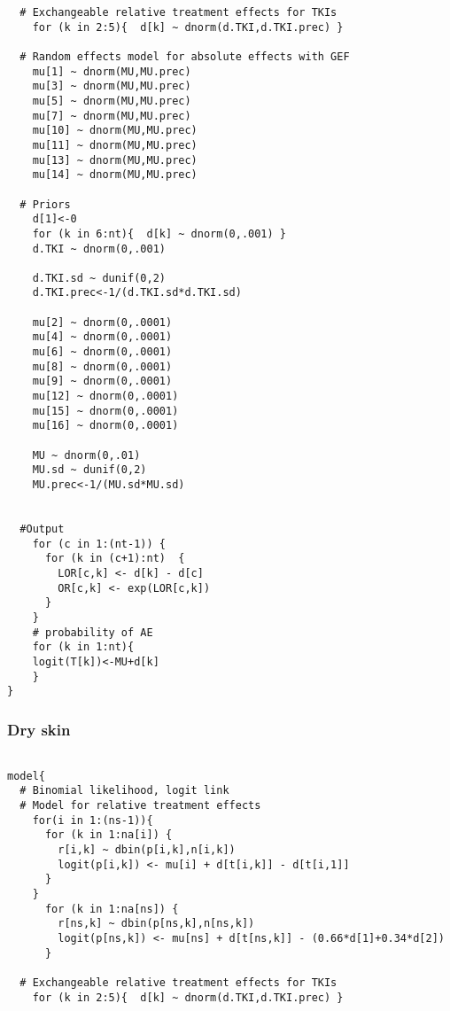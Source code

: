 \documentclass[11pt,final,fleqn]{article}\usepackage[]{graphicx}\usepackage[]{color}
\theoremstyle{plain}
\begin{document}
\begin{appendices}
\begin{verbatim}
  # Exchangeable relative treatment effects for TKIs
    for (k in 2:5){  d[k] ~ dnorm(d.TKI,d.TKI.prec) }
  
  # Random effects model for absolute effects with GEF
    mu[1] ~ dnorm(MU,MU.prec) 
    mu[3] ~ dnorm(MU,MU.prec) 
    mu[5] ~ dnorm(MU,MU.prec) 
    mu[7] ~ dnorm(MU,MU.prec) 
    mu[10] ~ dnorm(MU,MU.prec) 
    mu[11] ~ dnorm(MU,MU.prec) 
    mu[13] ~ dnorm(MU,MU.prec) 
    mu[14] ~ dnorm(MU,MU.prec) 
       
  # Priors
    d[1]<-0                                      
    for (k in 6:nt){  d[k] ~ dnorm(0,.001) }     
    d.TKI ~ dnorm(0,.001)
    
    d.TKI.sd ~ dunif(0,2) 
    d.TKI.prec<-1/(d.TKI.sd*d.TKI.sd)
    
    mu[2] ~ dnorm(0,.0001)                     
    mu[4] ~ dnorm(0,.0001)                       
    mu[6] ~ dnorm(0,.0001)                       
    mu[8] ~ dnorm(0,.0001)                       
    mu[9] ~ dnorm(0,.0001) 
    mu[12] ~ dnorm(0,.0001) 
    mu[15] ~ dnorm(0,.0001) 
    mu[16] ~ dnorm(0,.0001) 
      
    MU ~ dnorm(0,.01)                         
    MU.sd ~ dunif(0,2) 
    MU.prec<-1/(MU.sd*MU.sd)
    
      
  #Output                                        
    for (c in 1:(nt-1)) {                        
      for (k in (c+1):nt)  { 
        LOR[c,k] <- d[k] - d[c]
        OR[c,k] <- exp(LOR[c,k])
      }  
    }
    # probability of AE
    for (k in 1:nt){ 
    logit(T[k])<-MU+d[k]
    }
}

\end{verbatim}

\subsubsection{Dry skin} 
\begin{verbatim} 

model{
  # Binomial likelihood, logit link
  # Model for relative treatment effects
    for(i in 1:(ns-1)){                  
      for (k in 1:na[i]) {               
        r[i,k] ~ dbin(p[i,k],n[i,k])     
        logit(p[i,k]) <- mu[i] + d[t[i,k]] - d[t[i,1]]  
      }
    }   
      for (k in 1:na[ns]) {               
        r[ns,k] ~ dbin(p[ns,k],n[ns,k])     
        logit(p[ns,k]) <- mu[ns] + d[t[ns,k]] - (0.66*d[1]+0.34*d[2])  
      }
  
  # Exchangeable relative treatment effects for TKIs
    for (k in 2:5){  d[k] ~ dnorm(d.TKI,d.TKI.prec) }
  

\end{verbatim}
\end{appendices}
\end{document}
